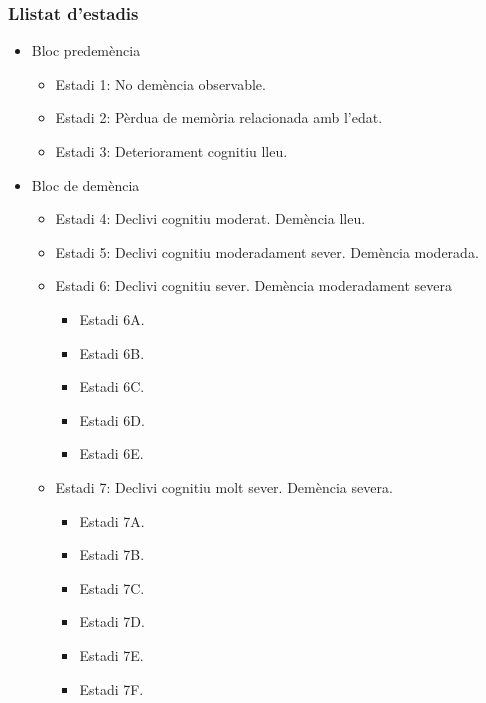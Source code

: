 \documentclass[a4paper,12pt]{article}
\begin{document}
\subsubsection*{Llistat d'estadis}
\begin{itemize}
    \item Bloc predemència
    \begin{itemize}
        \item Estadi 1: No demència observable.
        \item Estadi 2: Pèrdua de memòria relacionada amb l'edat.
        \item Estadi 3: Deteriorament cognitiu lleu.
    \end{itemize}
    \item Bloc de demència
    \begin{itemize}
        \item Estadi 4: Declivi cognitiu moderat. Demència lleu.
        \item Estadi 5: Declivi cognitiu moderadament sever. Demència moderada.
        \item Estadi 6: Declivi cognitiu sever. Demència moderadament severa
        \begin{itemize}
            \item Estadi 6A.
            \item Estadi 6B.
            \item Estadi 6C.
            \item Estadi 6D.
            \item Estadi 6E.
        \end{itemize}
        \item Estadi 7: Declivi cognitiu molt sever. Demència severa.
        \begin{itemize}
            \item Estadi 7A.
            \item Estadi 7B.
            \item Estadi 7C.
            \item Estadi 7D.
            \item Estadi 7E.
            \item Estadi 7F.
        \end{itemize}
    \end{itemize}
\end{itemize}
\end{document}
